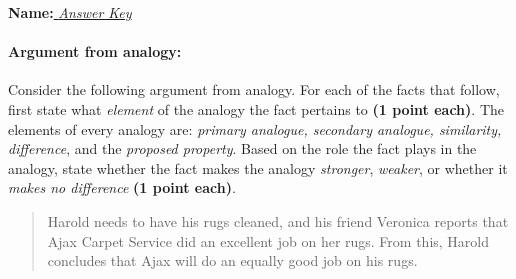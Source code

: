 \documentclass[10pt]{article}
\begin{document}
\textbf{Name:}\underline{  \textit{Answer Key}  }

\paragraph{Argument from analogy:} Consider the following argument from analogy.  For each of the facts that follow, first state what \textit{element} of the analogy the fact pertains to \textbf{(1 point each)}. The elements of every analogy are: \textit{primary analogue, secondary analogue, similarity, difference}, and the \textit{proposed property}. Based on the role the fact plays in the analogy, state whether the fact makes the analogy \textit{stronger}, \textit{weaker}, or whether it \textit{makes no difference} \textbf{(1 point each)}.

\begin{quote}
 Harold needs to have his rugs cleaned, and his friend Veronica reports that Ajax Carpet Service did an excellent job on her rugs. From this, Harold concludes that Ajax will do an equally good job on his rugs.
\end{quote}
\end{document}
